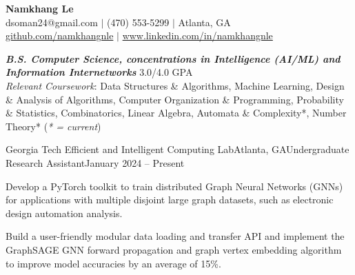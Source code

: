 \documentclass{article}
\begin{document}
\thispagestyle{empty}

\begin{center}
    \textbf{\LARGE Namkhang Le} \\
    dsoman24@gmail.com $|$ (470) 553-5299 $|$ Atlanta, GA \\
    \href{https://namkhangnle.github.io/Website/}{github.com/namkhangnle} $|$ \href{https://www.linkedin.com/in/namkhangnle/}{www.linkedin.com/in/namkhangnle}
\end{center}

\begin{flushleft}


{\textbf{\textit{B.S. Computer Science, concentrations in Intelligence (AI/ML) and Information Internetworks}} \hfill 3.0/4.0 GPA \\ \textit{Relevant Coursework}: Data Structures \& Algorithms, Machine Learning, Design \& Analysis of Algorithms, Computer Organization \& Programming, Probability \& Statistics, Combinatorics, Linear Algebra, Automata \& Complexity*, Number Theory* (\textit{* = current})}


    \begin{experience}{Georgia Tech Efficient and Intelligent Computing Lab}{Atlanta, GA}{Undergraduate Research Assistant}{January 2024 -- Present}
        \item Develop a PyTorch toolkit to train distributed Graph Neural Networks (GNNs) for applications with multiple disjoint large graph datasets, such as electronic design automation analysis.
        \item Build a user-friendly modular data loading and transfer API and implement the GraphSAGE GNN forward propagation and graph vertex embedding algorithm to improve model accuracies by an average of 15\%.
    \end{experience}


\end{flushleft}
\end{document}
